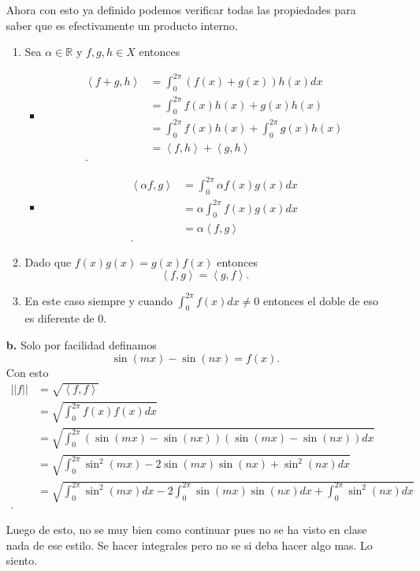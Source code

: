 \documentclass{report}
\begin{document}
\begin{enumerate}
    Ahora con esto ya definido podemos verificar todas las propiedades para saber que es efectivamente un producto interno.
    \begin{enumerate}
      \item Sea $\alpha \in \mathbb{R}$ y $f, g, h \in X$ entonces
	\begin{itemize}
	  \item 
	    \begin{align*}
	      \left<f + g, h \right> &= \int_0^{2\pi} \left( f\left( x \right) + g\left( x \right)  \right) h\left( x \right) dx \\
	      &= \int_0^{2\pi} f\left( x \right) h\left( x \right) + g\left( x \right) h\left( x \right)   \\
	      &= \int_0^{2\pi} f\left( x \right) h\left( x \right) + \int_0^{2\pi} g\left( x \right) h\left( x \right)  \\
	      &= \left<f, h \right> + \left<g, h \right> \\
	    .\end{align*}
	  \item 
	    \begin{align*}
	      \left<\alpha f, g \right> &= \int_0^{2\pi} \alpha f\left( x \right) g\left( x \right) dx\\
	      &= \alpha \int_0^{2\pi} f\left( x \right) g\left( x \right) dx \\
	      &= \alpha \left<f, g \right> \\
	    .\end{align*}
	\end{itemize}
      \item Dado que $f\left( x \right) g\left( x \right)  = g\left( x \right) f\left( x \right) $ entonces \[
	  \left<f, g \right> = \left<g, f \right>
      .\] 
    \item En este caso siempre y cuando $\int_0^{2\pi} f\left( x \right) dx \neq 0$ entonces el doble de eso es diferente de 0.
    \end{enumerate}
  \item[\textbf{b.}] Solo por facilidad definamos \[
      \sin\left( mx \right) - \sin\left( nx \right) = f\left( x \right)
  .\] Con esto
    \begin{align*}
      \left| \left| f \right|  \right| &= \sqrt{\left< f, f\right>}  \\
      &= \sqrt{\int_0^{2\pi} f\left( x \right) f\left( x \right) dx}  \\
      &= \sqrt{\int_0^{2\pi} \left( \sin\left( mx \right) - \sin\left( nx \right) \right) \left( \sin\left( mx \right) - \sin\left( nx \right)  \right) dx}  \\
      &= \sqrt{\int_0^{2\pi} \sin^2\left( mx \right) - 2\sin\left( mx \right) \sin\left( nx \right) + \sin^2\left( nx \right) dx}  \\
      &= \sqrt{\int_0^{2\pi} \sin^2\left( mx \right)dx - 2\int_0^{2\pi} \sin\left( mx \right) \sin\left( nx \right)dx + \int_0^{2\pi} \sin^2\left( nx \right)dx }  \\
    .\end{align*}

    Luego de esto, no se muy bien como continuar pues no se ha visto en clase nada de ese estilo. Se hacer integrales pero no se si deba hacer algo mas. Lo siento.
\end{enumerate}
\end{document}
